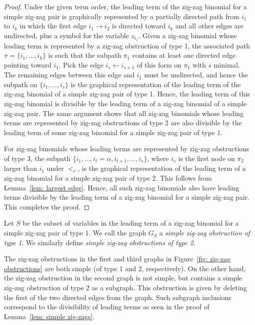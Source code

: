 \begin{proof}
Under the given term order, the leading term of the zig-zag binomial for a simple zig-zag pair is graphically represented by a partially directed path from $i_1$ to $i_k$ in which the first edge $i_1 \rightarrow i_2$ is directed toward $i_k$ and all other edges are undirected, plus a symbol for the variable $z_{i_1}$.
Given a zig-zag binomial whose leading term is represented by a zig-zag obstruction of type 1, the associated path $\pi = \{i_1,\ldots, i_k\}$ is such that the subpath $\pi_1$ contains at least one directed edge pointing toward $i_1$.  
Pick the edge $i_s\leftarrow i_{s+1}$ of this form on $\pi_1$ with $s$ minimal.  
The remaining edges between this edge and $i_1$ must be undirected, and hence the subpath on $\{i_1,\ldots, i_s\}$ is the graphical representation of the leading term of the zig-zag binomial of a simple zig-zag pair of type 1.
Hence, the leading term of this zig-zag binomial is divisible by the leading term of a zig-zag binomial of a simple zig-zag pair. 
The same argument shows that all zig-zag binomials whose leading terms are represented by zig-zag obstructions of type 2 are also divisible by the leading term of some zig-zag binomial for a simple zig-zag pair of type 1. 

For zig-zag binomials whose leading terms are represented by zig-zag obstructions of type 3, the subpath $\{i_1,\ldots, i_t = \alpha, i_{t+1},\ldots, i_s\}$, where $i_s$ is the first node on $\pi_2$ larger than $i_1$ under $<_r$, is the graphical representation of the leading term of a zig-zag binomial for a simple zig-zag pair of type 2. 
This follows from Lemma~\ref{lem: largest edge}. 
Hence, all such zig-zag binomials also have leading terms divisible by the leading term of a zig-zag binomial for a simple zig-zag pair. 
This completes the proof. 
\end{proof}

Let $S$ be the subset of variables in the leading term of a zig-zag binomial for a simple zig-zag pair of type 1.  
We call the graph $G_S$ a \emph{simple zig-zag obstruction of type 1}. 
We similarly define \emph{simple zig-zag obstructions of type 2}.

\begin{example}
    \label{ex: simple zig-zags}
The zig-zag obstructions in the first and third graphs in Figure~\ref{fig: zig-zag obstructions} are both simple (of type 1 and 2, respectively).  
On the other hand, the zig-zag obstruction in the second graph is not simple, but contains a simple zig-zag obstruction of type 2 as a subgraph.  
This obstruction is given by deleting the first of the two directed edges from the graph.  
Such subgraph inclusions correspond to the divisibility of leading terms as seen in the proof of Lemma~\ref{lem: simple zig-zags}.
\end{example}



